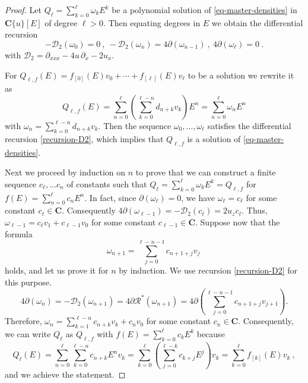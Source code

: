 \documentclass[10pt,a4paper]{amsart}
\newcommand{\cD}{\mathcal{D}}
\newcommand{\cR}{\mathcal{R}}
\newcommand{\coC}{\mathbf{C}}
\newcommand{\dx}{\partial_x}
\newcommand{\dxxx}{\partial_{xxx}}
\begin{document}
\begin{proof}
    Let $Q_\ell =\sum_{k=0} ^\ell \omega_k E^k$ be a polynomial solution of \eqref{eq-master-densities} in $\coC\{u\}[E]$ of degree $\ell >0$. Then equating degrees in $E$ we obtain the differential recursion
    \begin{equation}\label{recursion-D2}
        -\cD_2 (\omega_0 )=0 \ , \ -\cD_2 (\omega_n )=4 \partial (\omega_{n-1}) \ , \ 4 \partial (\omega_\ell )=0 \ .
    \end{equation}
    with $ \cD_2 = \dxxx - 4u\,\dx - 2u_x $. 

For $ Q_{\ell , f } (E) = f_{[0]}(E) v_0 +\cdots + f_{[\ell]}(E) v_\ell$ to be a solution we rewrite it as
\[
 Q_{\ell , f } (E) = \sum_{n=0}^{\ell} \left( \sum_{k=0}^{\ell -n} d_{n+k}  v_k \right) E^n  = \sum_{n=0}^{\ell}  \omega_n  E^n 
\]
with $\omega_n = \sum_{k=0}^{\ell -n} d_{n+k}  v_k$. Then the sequence $\omega_0 , \dots , \omega_\ell$ satisfies the differential recursion \eqref{recursion-D2}, which implies that $ Q_{\ell , f } $ is a solution of \eqref{eq-master-densities}.

Next we proceed by induction on $n$ to prove that we can construct a finite sequence $c_\ell , \dots c_n$ of constants such that $Q_\ell =\sum_{k=0} ^\ell \omega_k E^k=   Q_{\ell , f }$ for $f(E)=\sum_{n=0}^\ell c_n E^n$. In fact, since $\partial (\omega_\ell )=0$, we have $\omega_\ell =c_\ell$ for some constant $c_\ell \in \coC$. Consequently $4 \partial (\omega_{\ell -1}) = -\cD_2 (c _\ell  )=2u_z c_\ell$. Thus, $\omega_{\ell -1}= c_\ell v_1 +c_{\ell -1} v_0 $ for some constant $c_{\ell -1} \in \coC $. Suppose now that the formula
    \[
    \omega_{n+1} = \sum_{j=0}^{\ell-n-1}c_{n+1+j} v_j \ 
    \]
    holds, and let us prove it for $n$ by induction. We use recursion \eqref{recursion-D2} for this purpose.
    \[
    4 \partial (\omega_{n})= -\cD_2 (\omega_{n+1} )=4\partial \cR^* (\omega_{n+1})=4\partial 
    \left(
    \sum_{j=0}^{\ell-n-1} c_{n+1+j} v_{j+1}
    \right) .
    \]
 Therefore, $\omega_{n} = \sum_{k=1}^{\ell-n} c_{n+k} v_k + c_n v_0 $ for some constant $c_n \in \coC$. Consequently, we can write $Q_\ell $ as $Q_{\ell , f}$ with $f(E) = \sum_{k=0}^\ell c_k E^k$ because
   \[
   Q_{\ell } (E) = \sum_{n=0}^{\ell} \sum_{k=0}^{\ell -n} c_{n+k}  E^n  v_k= \sum_{k=0}^{\ell} 
   \left(
   \sum_{j=0}^{\ell -k} c_{k+j}E^j 
   \right)
   v_k = \sum_{k=0}^{\ell} f_{[k]} (E) 
     v_k \ ,
   \]
  and we achieve the statement.
\end{proof}
\end{document}
